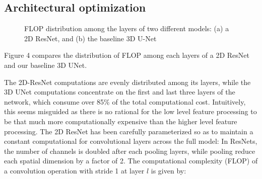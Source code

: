 \documentclass[runningheads]{llncs}
\begin{document}
\subsection{Architectural optimization}

\begin{figure}[h]
\centering
{}%
%

\centering
\caption{FLOP distribution among the layers of two different models: (a) a 2D ResNet, and (b) the baseline 3D U-Net}
\end{figure}

Figure 4 compares the distribution of FLOP among each layers of a 2D ResNet \cite{he2016deep} and our baseline 3D UNet.

The 2D-ResNet computations are evenly distributed among its layers, while the 3D UNet computations concentrate on the 
first and last three layers of the network, which consume over 85\% of the total computational cost.
Intuitively, this seems misguided as there is no rational for the low level feature processing to be that much more computationally 
expensive than the higher level feature processing.
The 2D ResNet has been carefully parameterized so as to maintain a constant computational 
for convolutional layers across the full model:
In ResNets, the number of channels is doubled after each pooling layers, 
while pooling reduce each spatial dimension by a factor of 2.
The computational complexity (FLOP) of a convolution operation with stride 1 at layer $l$ is given by:
\end{document}
